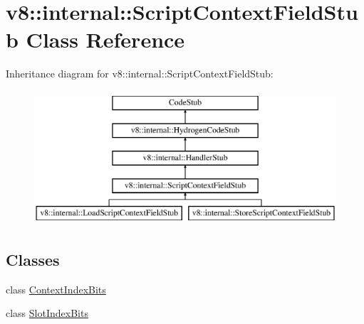 \hypertarget{classv8_1_1internal_1_1_script_context_field_stub}{}\section{v8\+:\+:internal\+:\+:Script\+Context\+Field\+Stub Class Reference}
\label{classv8_1_1internal_1_1_script_context_field_stub}
Inheritance diagram for v8\+:\+:internal\+:\+:Script\+Context\+Field\+Stub\+:\begin{figure}[H]
\begin{center}
\leavevmode
\includegraphics[height=5.000000cm]{classv8_1_1internal_1_1_script_context_field_stub}
\end{center}
\end{figure}
\subsection*{Classes}
\begin{DoxyCompactItemize}
\item 
class \hyperlink{classv8_1_1internal_1_1_script_context_field_stub_1_1_context_index_bits}{Context\+Index\+Bits}
\item 
class \hyperlink{classv8_1_1internal_1_1_script_context_field_stub_1_1_slot_index_bits}{Slot\+Index\+Bits}
\end{DoxyCompactItemize}
